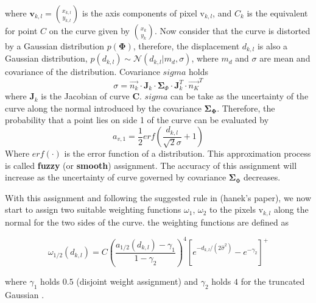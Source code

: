 where $\mathbf{v}_{k,l} = {x_{k,l} \choose y_{k,l}}$ is the axis components of pixel
$\mathrm{v}_{k,l}$, and $C_k$ is the equivalent for point $C$ on the
curve given by ${x_k \choose y_k}$. Now consider that the curve is
distorted by a Gaussian distribution $p(\mathbf{\Phi})$, therefore, the
displacement $d_{k,l}$ is also a Gaussian distribution, $p(d_{k,l}) \sim
\mathcal{N}(d_{k,l}|m_d, \sigma)$, where $m_d$ and $\sigma$ are mean
and covariance of the distribution. Covariance $sigma$ holds
\begin{equation}
  \label{eq:5.8}
  \sigma = \vec{n_k} \cdot \mathbf{J}_k \cdot \mathbf{\Sigma}_{\Phi}
  \cdot \mathbf{J}_k^T \cdot \vec{n_K}^T
\end{equation}
where $\mathbf{J}_k$ is the Jacobian of curve $\mathbf{C}$. $sigma$
can be take as the uncertainty of the curve along the normal
introduced by the covariance $\mathbf{\Sigma}_{\mathbf{\Phi}}$.
Therefore, the probability that a point lies on side 1 of the
curve can be evaluated by
\begin{equation}
  \label{eq:5.9}
  a_{v,1} = \frac{1}{2}erf(\frac{d_{k,l}}{\sqrt{2}\sigma} + 1)
\end{equation}
Where $erf(\cdot)$ is the error function of a distribution. This
approximation process is called \textbf{fuzzy} (or \textbf{smooth})
assignment. The accuracy of this assignment will increase as the
uncertainty of curve governed by covariance
$\mathbf{\Sigma}_{\mathrm{\Phi}}$ decreases.

With this assignment and following the suggested rule in (hanek's
paper), we now start to assign two suitable weighting functions
$\omega_1$, $\omega_2$ to the pixels $\mathrm{v}_{k,l}$ along the
normal for the two sides of the curve. the weighting functions are
defined as

\begin{equation}
  \label{eq:5.10}
  \omega_{1/2}(d_{k,l}) = C\left(\frac{a_{1/2}(d_{k,l}) -
    \gamma_1}{1-\gamma_2}\right)^4 \left[e^{-d_{k,l}/(2\hat{\sigma}^2)} - e^{-\gamma_2}\right]^+
\end{equation}


where $\gamma_1$ holds $0.5$ (disjoint weight assignment) and $\gamma_2$
holds $4$ for the truncated Gaussian \cite{hanek2004contracting}. 


